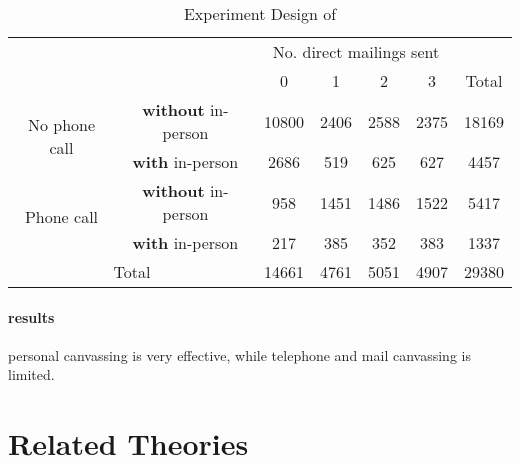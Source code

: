 \documentclass[twoside]{article}
\theoremstyle{definition}
\begin{document}
\begin{table}[ht]
\caption{Experiment Design of \citet{gerber2000effects}}\label{tab:gerber2000design}
\centering
    \begin{tabular}{ccccccc}
             & & \multicolumn{4}{c}{No. direct mailings sent} & \\ \cline{3-6}
            & & 0 & 1 & 2 & 3 & Total\\ 
        \hline
        \multirow{2}{*}{No phone call} & \textbf{without} in-person &  10800 & 2406 & 2588 & 2375 & 18169 \\
         & \textbf{with} in-person & 2686 & 519 & 625 & 627 & 4457\\
         \multirow{2}{*}{Phone call} & \textbf{without} in-person &  958 & 1451 & 1486 & 1522 & 5417 \\
         & \textbf{with} in-person & 217 & 385 & 352 & 383 & 1337\\
        \hline
        \multicolumn{2}{c}{Total} & 14661 & 4761 & 5051 & 4907 & 29380\\
    \end{tabular}
\end{table}

\paragraph*{results} personal canvassing is very effective, while telephone and mail canvassing is limited.

\subsubsection*{\citet*{gerber2008social}}

\subsection*{\citet*{washington2006black}}

\section{Related Theories}



\newpage


\end{document}
